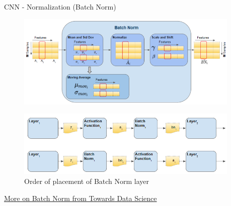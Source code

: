 \begin{frame}{CNN - Normalization (Batch Norm)}
    \begin{figure}
    \centering
    \includegraphics[width=0.95\textwidth,height=0.4\textheight,keepaspectratio]{images/cnn/batch-norm-unit.png}
    \end{figure}

    \begin{figure}
    \centering
    \includegraphics[width=0.95\textwidth,height=0.4\textheight,keepaspectratio]{images/cnn/batch-norm-sequence.png}
    \caption{Order of placement of Batch Norm layer}
    \end{figure}

    \href{https://towardsdatascience.com/batch-norm-explained-visually-how-it-works-and-why-neural-networks-need-it-b18919692739/}{More on Batch Norm from Towards Data Science}
\end{frame}